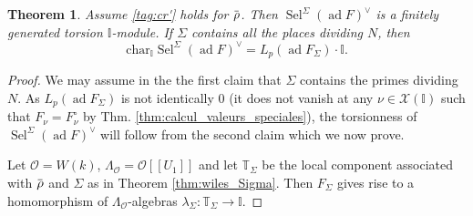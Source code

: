 \documentclass[12pt]{amsart}
\newcommand\bI{\mathbb{I}}
\newcommand\bT{\mathbb{T}}
\newcommand\cO{\mathcal{O}}
\newcommand\cX{\mathcal{X}}
\newcommand{\ob}[1]{\mkern 1.5mu\overline{\mkern-1.5mu#1\mkern-1.5mu}\mkern 1.5mu}
\renewcommand{\char}{\textrm{char}}
\DeclareMathOperator{\ad}{ad}
\DeclareMathOperator{\Sel}{Sel}
\theoremstyle{defstyle}
\theoremstyle{thmstyle}
\newtheorem{theorem}[subsubsection]{Theorem}
\begin{document}
\begin{theorem}\label{thm:main_conjecture_large_sigma}
	Assume \eqref{tag:cr'} holds for $\ob{\rho}$. Then $\Sel^\Sigma(\ad F)^\vee$ is a finitely generated torsion $\bI$-module. If $\Sigma$ contains all the places dividing $N$, then 
	\[\char_\bI \Sel^\Sigma(\ad F)^\vee=L_p(\ad F_\Sigma)\cdot \bI.\]
\end{theorem}
\begin{proof}
We may assume in the the first claim that $\Sigma$ contains the primes dividing $N$. As $L_p(\ad F_\Sigma)$ is not identically $0$ (it does not vanish at any $\nu\in\cX(\bI)$ such that $F_\nu=F_\nu^\circ$ by Thm. \ref{thm:calcul_valeurs_speciales}), the torsionness of $\Sel^\Sigma(\ad F)^\vee$ will follow from the second claim which we now prove.

Let $\cO=W(k)$, $\Lambda_\cO=\cO[[U_1]]$ and let $\bT_\Sigma$ be the local component associated with $\ob{\rho}$ and $\Sigma$ as in Theorem \ref{thm:wiles_Sigma}. Then $F_\Sigma$ gives rise to a homomorphism of $\Lambda_\cO$-algebras $\lambda_\Sigma \colon \bT_\Sigma \to \bI$. 


\end{proof}
\end{document}
